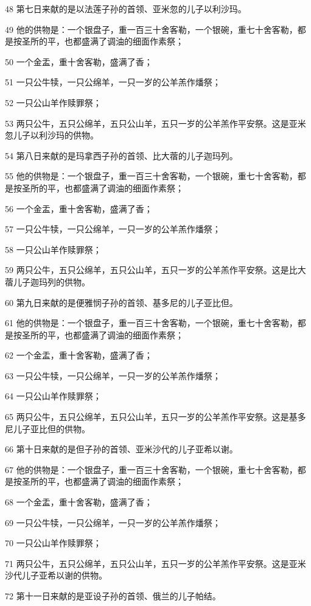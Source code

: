 \par 48 第七日来献的是以法莲子孙的首领、亚米忽的儿子以利沙玛。
\par 49 他的供物是：一个银盘子，重一百三十舍客勒，一个银碗，重七十舍客勒，都是按圣所的平，也都盛满了调油的细面作素祭；
\par 50 一个金盂，重十舍客勒，盛满了香；
\par 51 一只公牛犊，一只公绵羊，一只一岁的公羊羔作燔祭；
\par 52 一只公山羊作赎罪祭；
\par 53 两只公牛，五只公绵羊，五只公山羊，五只一岁的公羊羔作平安祭。这是亚米忽儿子以利沙玛的供物。
\par 54 第八日来献的是玛拿西子孙的首领、比大蓿的儿子迦玛列。
\par 55 他的供物是：一个银盘子，重一百三十舍客勒，一个银碗，重七十舍客勒，都是按圣所的平，也都盛满了调油的细面作素祭；
\par 56 一个金盂，重十舍客勒，盛满了香；
\par 57 一只公牛犊，一只公绵羊，一只一岁的公羊羔作燔祭；
\par 58 一只公山羊作赎罪祭；
\par 59 两只公牛，五只公绵羊，五只公山羊，五只一岁的公羊羔作平安祭。这是比大蓿儿子迦玛列的供物。
\par 60 第九日来献的是便雅悯子孙的首领、基多尼的儿子亚比但。
\par 61 他的供物是：一个银盘子，重一百三十舍客勒，一个银碗，重七十舍客勒，都是按圣所的平，也都盛满了调油的细面作素祭；
\par 62 一个金盂，重十舍客勒，盛满了香；
\par 63 一只公牛犊，一只公绵羊，一只一岁的公羊羔作燔祭；
\par 64 一只公山羊作赎罪祭；
\par 65 两只公牛，五只公绵羊，五只公山羊，五只一岁的公羊羔作平安祭。这是基多尼儿子亚比但的供物。
\par 66 第十日来献的是但子孙的首领、亚米沙代的儿子亚希以谢。
\par 67 他的供物是：一个银盘子，重一百三十舍客勒，一个银碗，重七十舍客勒，都是按圣所的平，也都盛满了调油的细面作素祭；
\par 68 一个金盂，重十舍客勒，盛满了香；
\par 69 一只公牛犊，一只公绵羊，一只一岁的公羊羔作燔祭；
\par 70 一只公山羊作赎罪祭；
\par 71 两只公牛，五只公绵羊，五只公山羊，五只一岁的公羊羔作平安祭。这是亚米沙代儿子亚希以谢的供物。
\par 72 第十一日来献的是亚设子孙的首领、俄兰的儿子帕结。
